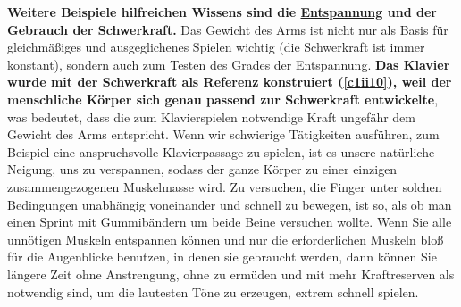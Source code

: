 \textbf{Weitere Beispiele hilfreichen Wissens sind die \hyperref[c1ii14]{Entspannung} und der Gebrauch der Schwerkraft.}
Das Gewicht des Arms ist nicht nur als Basis für gleichmäßiges und ausgeglichenes Spielen wichtig (die Schwerkraft ist immer konstant), sondern auch zum Testen des Grades der Entspannung.
\textbf{Das Klavier wurde mit der Schwerkraft als Referenz konstruiert (\hyperref[c1ii10]{\autoref{c1ii10}}), weil der menschliche Körper sich genau passend zur Schwerkraft entwickelte}, was bedeutet, dass die zum Klavierspielen notwendige Kraft ungefähr dem Gewicht des Arms entspricht.
Wenn wir schwierige Tätigkeiten ausführen, zum Beispiel eine anspruchsvolle Klavierpassage zu spielen, ist es unsere natürliche Neigung, uns zu verspannen, sodass der ganze Körper zu einer einzigen zusammengezogenen Muskelmasse wird.
Zu versuchen, die Finger unter solchen Bedingungen unabhängig voneinander und schnell zu bewegen, ist so, als ob man einen Sprint mit Gummibändern um beide Beine versuchen wollte.
Wenn Sie alle unnötigen Muskeln entspannen können und nur die erforderlichen Muskeln bloß für die Augenblicke benutzen, in denen sie gebraucht werden, dann können Sie längere Zeit ohne Anstrengung, ohne zu ermüden und mit mehr Kraftreserven als notwendig sind, um die lautesten Töne zu erzeugen, extrem schnell spielen. 

